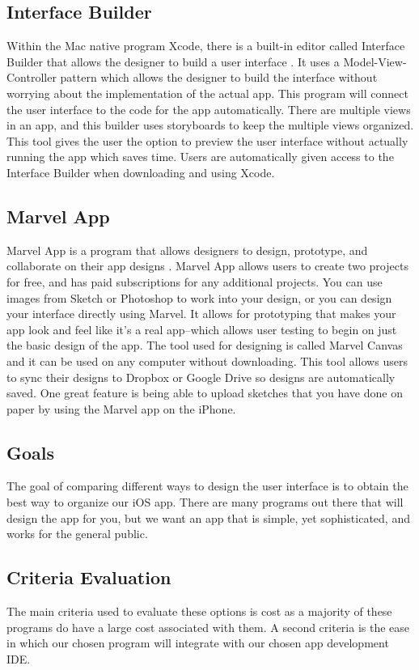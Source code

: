 \documentclass[letterpaper,10pt,draftclsnofoot,onecolumn,titlepage]{IEEEtran}
\begin{document}
	\subsection{Interface Builder}
	Within the Mac native program Xcode, there is a built-in editor called Interface Builder that allows the designer to build a user interface \cite{Interface}.
	It uses a Model-View-Controller pattern which allows the designer to build the interface without worrying about the implementation of the actual app.
	This program will connect the user interface to the code for the app automatically.
	There are multiple views in an app, and this builder uses storyboards to keep the multiple views organized.
	This tool gives the user the option to preview the user interface without actually running the app which saves time.
	Users are automatically given access to the Interface Builder when downloading and using Xcode.

	\subsection{Marvel App}
	Marvel App is a program that allows designers to design, prototype, and collaborate on their app designs \cite{Marvel}.
	Marvel App allows users to create two projects for free, and has paid subscriptions for any additional projects.
	You can use images from Sketch or Photoshop to work into your design, or you can design your interface directly using Marvel.
	It allows for prototyping that makes your app look and feel like it's a real app--which allows user testing to begin on just the basic design of the app.
	The tool used for designing is called Marvel Canvas and it can be used on any computer without downloading.
	This tool allows users to sync their designs to Dropbox or Google Drive so designs are automatically saved.
	One great feature is being able to upload sketches that you have done on paper by using the Marvel app on the iPhone.

	\subsection{Goals}
	The goal of comparing different ways to design the user interface is to obtain the best way to organize our iOS app.
	There are many programs out there that will design the app for you, but we want an app that is simple, yet sophisticated, and works for the general public.

	\subsection{Criteria Evaluation}
	The main criteria used to evaluate these options is cost as a majority of these programs do have a large cost associated with them.
	A second criteria is the ease in which our chosen program will integrate with our chosen app development IDE.
\end{document}
